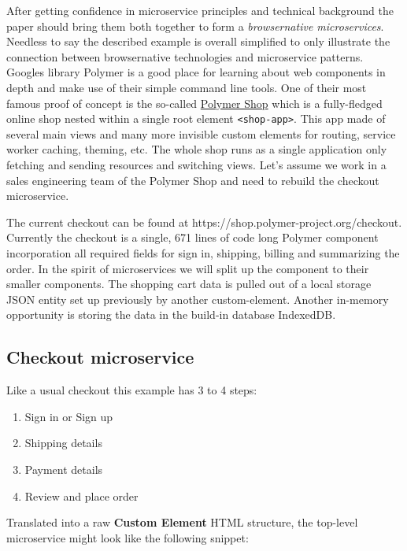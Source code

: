 \documentclass[]{article}
\providecommand{\tightlist}{%
  \setlength{\itemsep}{0pt}\setlength{\parskip}{0pt}}
\begin{document}
After getting confidence in microservice principles and technical
background the paper should bring them both together to form a
\emph{browsernative microservices}. Needless to say the described
example is overall simplified to only illustrate the connection between
browsernative technologies and microservice patterns. Googles library
Polymer is a good place for learning about web components in depth and
make use of their simple command line tools. One of their most famous
proof of concept is the so-called
\href{https://shop.polymer-project.org/}{Polymer Shop} which is a
fully-fledged online shop nested within a single root element
\texttt{\textless{}shop-app\textgreater{}}. This app made of several
main views and many more invisible custom elements for routing, service
worker caching, theming, etc. The whole shop runs as a single
application only fetching and sending resources and switching views.
Let's assume we work in a sales engineering team of the Polymer Shop and
need to rebuild the checkout microservice.

The current checkout can be found at
https://shop.polymer-project.org/checkout. Currently the checkout is a
single, 671 lines of code long Polymer component incorporation all
required fields for sign in, shipping, billing and summarizing the
order. In the spirit of microservices we will split up the component to
their smaller components. The shopping cart data is pulled out of a
local storage JSON entity set up previously by another custom-element.
Another in-memory opportunity is storing the data in the build-in
database IndexedDB.

\subsection{Checkout microservice}\label{checkout-microservice}

Like a usual checkout this example has 3 to 4 steps:

\begin{enumerate}
\def\labelenumi{\arabic{enumi}.}
\tightlist
\item
  Sign in or Sign up
\item
  Shipping details
\item
  Payment details
\item
  Review and place order
\end{enumerate}

Translated into a raw \textbf{Custom Element} HTML structure, the
top-level microservice might look like the following snippet:
\end{document}
